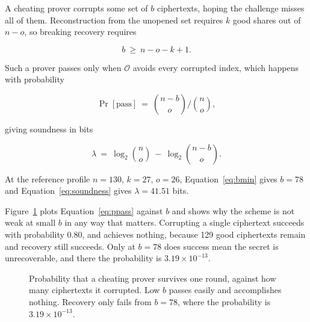 \documentclass[11pt,a4paper]{article}
\begin{document}
A cheating prover corrupts some set of $b$ ciphertexts, hoping the challenge
misses all of them. Reconstruction from the unopened set requires $k$ good shares
out of $n-o$, so breaking recovery requires

\begin{equation}
b \ \geq\ n - o - k + 1.
\label{eq:bmin}
\end{equation}

Such a prover passes only when $\mathcal{O}$ avoids every corrupted index, which
happens with probability

\begin{equation}
\Pr[\text{pass}] \ =\ \binom{n-b}{o} \Big/ \binom{n}{o},
\label{eq:ppass}
\end{equation}

giving soundness in bits

\begin{equation}
\lambda \ =\ \log_2 \binom{n}{o} \ -\ \log_2 \binom{n-b}{o}.
\label{eq:soundness}
\end{equation}

At the reference profile $n = 130$, $k = 27$, $o = 26$, Equation~\ref{eq:bmin}
gives $b = 78$ and Equation~\ref{eq:soundness} gives $\lambda = 41.51$ bits.

Figure~\ref{fig:cheating} plots Equation~\ref{eq:ppass} against $b$ and shows why
the scheme is not weak at small $b$ in any way that matters. Corrupting a single
ciphertext succeeds with probability $0.80$, and achieves nothing, because 129
good ciphertexts remain and recovery still succeeds. Only at $b = 78$ does
success mean the secret is unrecoverable, and there the probability is
$3.19 \times 10^{-13}$.

\begin{figure}[t]
\centering
{}
\caption{Probability that a cheating prover survives one round, against how many
ciphertexts it corrupted. Low $b$ passes easily and accomplishes nothing.
Recovery only fails from $b = 78$, where the probability is
$3.19 \times 10^{-13}$.}
\label{fig:cheating}
\end{figure}
\end{document}
